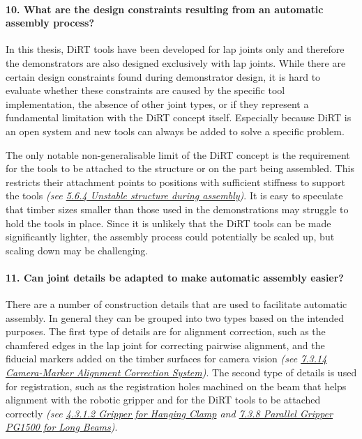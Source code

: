 	\paragraph{10. What are the design constraints resulting from an automatic assembly process?}

In this thesis, DiRT tools have been developed for lap joints only and therefore the demonstrators are also designed exclusively with lap joints. While there are certain design constraints found during demonstrator design, it is hard to evaluate whether these constraints are caused by the specific tool implementation, the absence of other joint types, or if they represent a fundamental limitation with the DiRT concept itself. Especially because DiRT is an open system and new tools can always be added to solve a specific problem.

The only notable non-generalisable limit of the DiRT concept is the requirement for the tools to be attached to the structure or on the part being assembled. This restricts their attachment points to positions with sufficient stiffness to support the tools \textit{(see \ul{5.6.4 Unstable structure during assembly})}. It is easy to speculate that timber sizes smaller than those used in the demonstrations may struggle to hold the tools in place. Since it is unlikely that the DiRT tools can be made significantly lighter, the assembly process could potentially be scaled up, but scaling down may be challenging.

\paragraph{11. Can joint details be adapted to make automatic assembly easier?}

There are a number of construction details that are used to facilitate automatic assembly. In general they can be grouped into two types based on the intended purposes. The first type of details are for alignment correction, such as the chamfered edges in the lap joint for correcting pairwise alignment, and the fiducial markers added on the timber surfaces for camera vision \textit{(see \ul{7.3.14 Camera-Marker Alignment Correction System})}. The second type of details is used for registration, such as the registration holes machined on the beam that helps alignment with the robotic gripper and for the DiRT tools to be attached correctly \textit{(see \ul{4.3.1.2 Gripper for Hanging Clamp} and \ul{7.3.8 Parallel Gripper PG1500 for Long Beams})}.

